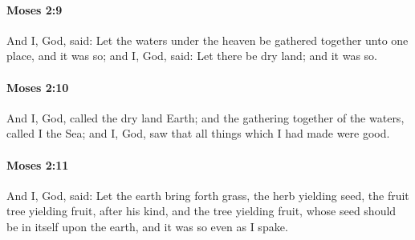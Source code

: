 		\paragraph{Moses 2:9} %
			\label{MOSES-2-9}

			And I, God, said: Let the waters under the heaven be gathered together unto one place, and it was so; and I, God, said: Let there be dry land; and it was so.


		\paragraph{Moses 2:10} %
			\label{MOSES-2-10}

			And I, God, called the dry land Earth; and the gathering together of the waters, called I the Sea; and I, God, saw that all things which I had made were good.


		\paragraph{Moses 2:11} %
			\label{MOSES-2-11}

			And I, God, said: Let the earth bring forth grass, the herb yielding seed, the fruit tree yielding fruit, after his kind, and the tree yielding fruit, whose seed should be in itself upon the earth, and it was so even as I spake.


